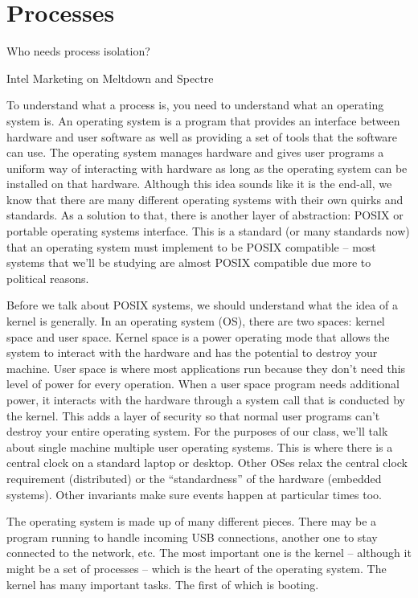 \chapter{Processes}

\epigraph{Who needs process isolation?}{Intel Marketing on Meltdown and Spectre}

To understand what a process is, you need to understand what an operating system is.
An operating system is a program that provides an interface between hardware and user software as well as providing a set of tools that the software can use.
The operating system manages hardware and gives user programs a uniform way of interacting with hardware as long as the operating system can be installed on that hardware.
Although this idea sounds like it is the end-all, we know that there are many different operating systems with their own quirks and standards.
As a solution to that, there is another layer of abstraction: POSIX or portable operating systems interface.
This is a standard (or many standards now) that an operating system must implement to be POSIX compatible -- most systems that we'll be studying are almost POSIX compatible due more to political reasons.

Before we talk about POSIX systems, we should understand what the idea of a kernel is generally.
In an operating system (OS), there are two spaces: kernel space and user space.
Kernel space is a power operating mode that allows the system to interact with the hardware and has the potential to destroy your machine.
User space is where most applications run because they don't need this level of power for every operation.
When a user space program needs additional power, it interacts with the hardware through a system call that is conducted by the kernel.
This adds a layer of security so that normal user programs can't destroy your entire operating system.
For the purposes of our class, we'll talk about single machine multiple user operating systems.
This is where there is a central clock on a standard laptop or desktop.
Other OSes relax the central clock requirement (distributed) or the ``standardness'' of the hardware (embedded systems).
Other invariants make sure events happen at particular times too.

The operating system is made up of many different pieces.
There may be a program running to handle incoming USB connections, another one to stay connected to the network, etc.
The most important one is the kernel -- although it might be a set of processes -- which is the heart of the operating system.
The kernel has many important tasks.
The first of which is booting.

